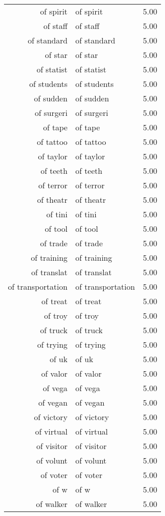 \begin{table}[ht]
\begin{tabular}{rlr}
  of spirit & of spirit & 5.00 \\ 
  of staff & of staff & 5.00 \\ 
  of standard & of standard & 5.00 \\ 
  of star & of star & 5.00 \\ 
  of statist & of statist & 5.00 \\ 
  of students & of students & 5.00 \\ 
  of sudden & of sudden & 5.00 \\ 
  of surgeri & of surgeri & 5.00 \\ 
  of tape & of tape & 5.00 \\ 
  of tattoo & of tattoo & 5.00 \\ 
  of taylor & of taylor & 5.00 \\ 
  of teeth & of teeth & 5.00 \\ 
  of terror & of terror & 5.00 \\ 
  of theatr & of theatr & 5.00 \\ 
  of tini & of tini & 5.00 \\ 
  of tool & of tool & 5.00 \\ 
  of trade & of trade & 5.00 \\ 
  of training & of training & 5.00 \\ 
  of translat & of translat & 5.00 \\ 
  of transportation & of transportation & 5.00 \\ 
  of treat & of treat & 5.00 \\ 
  of troy & of troy & 5.00 \\ 
  of truck & of truck & 5.00 \\ 
  of trying & of trying & 5.00 \\ 
  of uk & of uk & 5.00 \\ 
  of valor & of valor & 5.00 \\ 
  of vega & of vega & 5.00 \\ 
  of vegan & of vegan & 5.00 \\ 
  of victory & of victory & 5.00 \\ 
  of virtual & of virtual & 5.00 \\ 
  of visitor & of visitor & 5.00 \\ 
  of volunt & of volunt & 5.00 \\ 
  of voter & of voter & 5.00 \\ 
  of w & of w & 5.00 \\ 
  of walker & of walker & 5.00 \\ 

\end{tabular}
\end{table}
